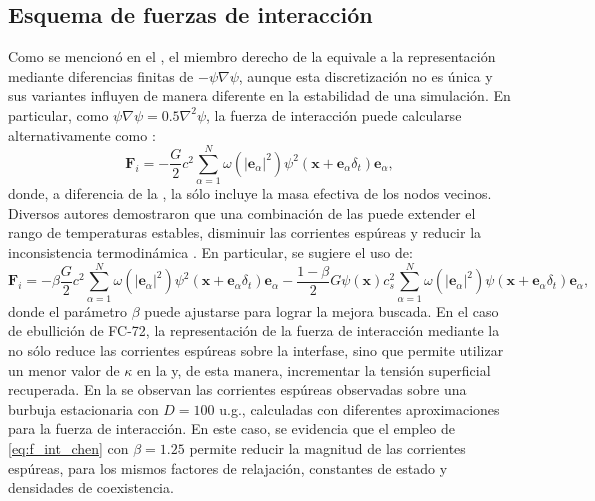 \subsection{Esquema de fuerzas de interacci\'on}

Como se mencion\'o en el , el miembro derecho de la  equivale a la representaci\'on mediante diferencias finitas de $-\psi \nabla \psi$, aunque esta discretizaci\'on no es \'unica y sus variantes influyen de manera diferente en la estabilidad de una simulaci\'on. En particular, como $\psi \nabla \psi = 0.5 \nabla^2 \psi$, la fuerza de interacci\'on puede calcularse alternativamente como \cite{chen_critical_2014}:
\begin{equation}
	\bm{F}_i = -\dfrac{G}{2} c^2 \sum_{\alpha=1}^N \omega(|\bm{e}_{\alpha}|^2)\psi^2(\bm{x}+\bm{e}_{\alpha}\delta_t)\bm{e}_{\alpha},
	\label{eq:f_int_chen_0}
\end{equation}
donde, a diferencia de la , la  s\'olo incluye la masa efectiva de los nodos vecinos. Diversos autores demostraron que una combinaci\'on de las  puede extender el rango de temperaturas estables, disminuir las corrientes esp\'ureas y reducir la inconsistencia termodin\'amica \cite{kupershtokh_equations_2009, gong_numerical_2012}. En particular, se sugiere el uso de: 
\begin{equation}
	\bm{F}_i = -\beta\dfrac{G}{2} c^2 \sum_{\alpha=1}^N \omega(|\bm{e}_{\alpha}|^2)\psi^2(\bm{x}+\bm{e}_{\alpha}\delta_t)\bm{e}_{\alpha}
	-\dfrac{1-\beta}{2} G\psi(\bm{x})c_s^2 \sum_{\alpha=1}^N \omega(|\bm{e}_{\alpha}|^2)\psi(\bm{x}+\bm{e}_{\alpha}\delta_t)\bm{e}_{\alpha},
	\label{eq:f_int_chen}
\end{equation}
donde el par\'ametro $\beta$ puede ajustarse para lograr la mejora buscada. En el caso de ebullici\'on de FC-72, la representaci\'on de la fuerza de interacci\'on mediante la  no s\'olo reduce las corrientes esp\'ureas sobre la interfase, sino que permite utilizar un menor valor de $\kappa$ en la  y, de esta manera, incrementar la tensi\'on superficial recuperada. En la  se observan las corrientes esp\'ureas observadas sobre una burbuja estacionaria con $D=100$ u.g., calculadas con diferentes aproximaciones para la fuerza de interacci\'on. En este caso, se evidencia que el empleo de \eqref{eq:f_int_chen} con $\beta=1.25$ permite reducir la magnitud de las corrientes esp\'ureas, para los mismos factores de relajaci\'on, constantes de estado y densidades de coexistencia.

